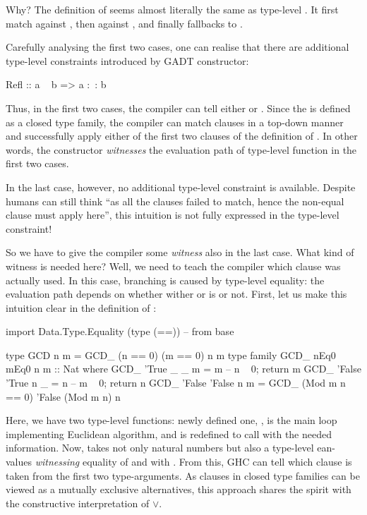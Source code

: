 \documentclass[demotion-paper.tex]{subfiles}
\begin{document}
Why? The definition of  seems almost literally the same as type-level .
It first match  against , then  against , and finally fallbacks to .

Carefully analysing the first two cases, one can realise that there are additional type-level constraints introduced by  GADT constructor:

\begin{code}
  Refl :: a ~ b => a :~: b
\end{code}

Thus, in the first two cases, the compiler can tell either  or .
Since the  is defined as a closed type family, the compiler can match clauses in a top-down manner and successfully apply either of the first two clauses of the definition of .
In other words, the constructor  \emph{witnesses} the evaluation path of type-level function  in the first two cases.

In the last case, however, no additional type-level constraint is available.
Despite humans can still think ``as all the  clauses failed to match, hence the non-equal clause must apply here'', this intuition is not fully expressed in the type-level constraint!

So we have to give the compiler some \emph{witness} also in the last case.
What kind of witness is needed here?
Well, we need to teach the compiler which clause was actually used.
In this case, branching is caused by type-level equality: the evaluation path depends on whether wither  or  is  or not.
First, let us make this intuition clear in the definition of :

\begin{code}
import Data.Type.Equality (type (==)) -- from base

type GCD n m = GCD_ (n == 0) (m == 0) n m
type family GCD_ nEq0 mEq0 n m :: Nat where
  GCD_ 'True  _      _ m = m   -- n ~ 0; return m
  GCD_ 'False 'True  n _ = n   -- m ~ 0; return n
  GCD_ 'False 'False n m = 
    GCD_ (Mod m n == 0) 'False (Mod m n) n
\end{code}

Here, we have two type-level functions: newly defined one, , is the main loop implementing Euclidean algorithm, and
 is redefined to call  with the needed information.
Now,  takes not only natural numbers but also a type-level ean-values \emph{witnessing} equality of  and  with .
From this, GHC can tell which clause is taken from the first two type-arguments.
As clauses in closed type families can be viewed as a mutually exclusive alternatives, this approach shares the spirit with the constructive interpretation of $\vee$.
\end{document}
